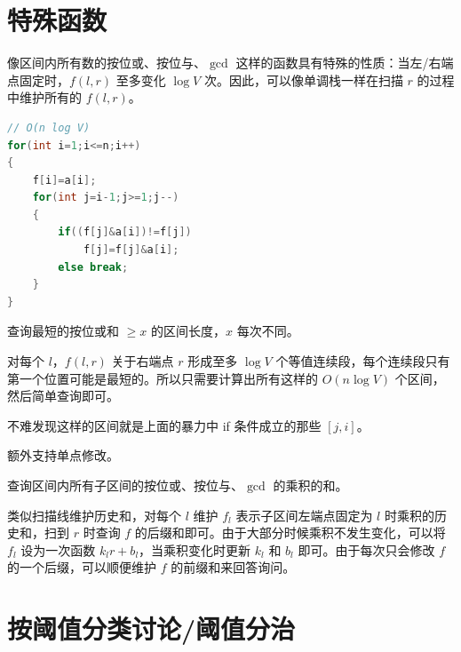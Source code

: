 \section{特殊函数}

像区间内所有数的按位或、按位与、$\gcd$ 这样的函数具有特殊的性质：当左/右端点固定时，$f(l,r)$ 至多变化 $\log V$ 次。因此，可以像单调栈一样在扫描 $r$ 的过程中维护所有的 $f(l,r)$。

\begin{lstlisting}[language=C++]
// O(n log V)
for(int i=1;i<=n;i++)
{
    f[i]=a[i];
    for(int j=i-1;j>=1;j--)
    {
        if((f[j]&a[i])!=f[j])
            f[j]=f[j]&a[i];
        else break;
    }
}
\end{lstlisting}

\begin{example}
    查询最短的按位或和 $\ge x$ 的区间长度，$x$ 每次不同。
\end{example}
\begin{solution}
    对每个 $l$，$f(l,r)$ 关于右端点 $r$ 形成至多 $\log V$ 个等值连续段，每个连续段只有第一个位置可能是最短的。所以只需要计算出所有这样的 $O(n\log V)$ 个区间，然后简单查询即可。

    不难发现这样的区间就是上面的暴力中 if 条件成立的那些 $[j,i]$。
\end{solution}
\begin{exercise}[P5065]
    额外支持单点修改。
\end{exercise}

\begin{example}[P9335]
    查询区间内所有子区间的按位或、按位与、$\gcd$ 的乘积的和。
\end{example}
\begin{solution}
    类似扫描线维护历史和，对每个 $l$ 维护 $f_l$ 表示子区间左端点固定为 $l$ 时乘积的历史和，扫到 $r$ 时查询 $f$ 的后缀和即可。由于大部分时候乘积不发生变化，可以将 $f_l$ 设为一次函数 $k_l r+b_l$，当乘积变化时更新 $k_l$ 和 $b_l$ 即可。由于每次只会修改 $f$ 的一个后缀，可以顺便维护 $f$ 的前缀和来回答询问。
\end{solution}



\section{按阈值分类讨论/阈值分治}

